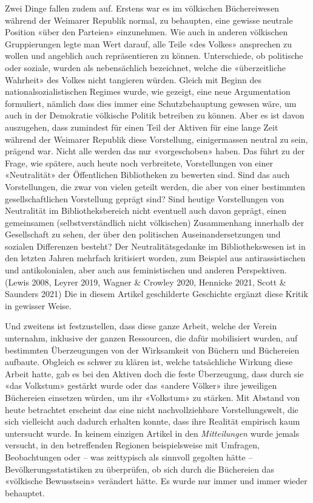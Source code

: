 \documentclass[a4paper,
fontsize=11pt,
oneside,
numbers=noperiodatend,
parskip=half-,
bibliography=totoc,
final
]{scrartcl}
\begin{document}
Zwei Dinge fallen zudem auf. Erstens war es im völkischen Büchereiwesen
während der Weimarer Republik normal, zu behaupten, eine gewisse
neutrale Position «über den Parteien» einzunehmen. Wie auch in anderen
völkischen Gruppierungen legte man Wert darauf, alle Teile «des Volkes»
ansprechen zu wollen und angeblich auch repräsentieren zu können.
Unterschiede, ob politische oder soziale, wurden als nebensächlich
bezeichnet, welche die «überzeitliche Wahrheit» des Volkes nicht
tangieren würden. Gleich mit Beginn des nationalsozialistischen Regimes
wurde, wie gezeigt, eine neue Argumentation formuliert, nämlich dass
dies immer eine Schutzbehauptung gewesen wäre, um auch in der Demokratie
völkische Politik betreiben zu können. Aber es ist davon auszugehen,
dass zumindest für einen Teil der Aktiven für eine lange Zeit während
der Weimarer Republik diese Vorstellung, einigermassen neutral zu sein,
prägend war. Nicht alle werden das nur «vorgeschoben» haben. Das führt
zu der Frage, wie spätere, auch heute noch verbreitete, Vorstellungen
von einer «Neutralität» der Öffentlichen Bibliotheken zu bewerten sind.
Sind das auch Vorstellungen, die zwar von vielen geteilt werden, die
aber von einer bestimmten gesellschaftlichen Vorstellung geprägt sind?
Sind heutige Vorstellungen von Neutralität im Bibliotheksbereich nicht
eventuell auch davon geprägt, einen gemeinsamen (selbstverständlich
nicht völkischen) Zusammenhang innerhalb der Gesellschaft zu sehen, der
über den politischen Auseinandersetzungen und sozialen Differenzen
besteht? Der Neutralitätsgedanke im Bibliothekswesen ist in den letzten
Jahren mehrfach kritisiert worden, zum Beispiel aus antirassistischen
und antikolonialen, aber auch aus feministischen und anderen
Perspektiven. (Lewis 2008, Leyrer 2019, Wagner \& Crowley 2020, Hennicke
2021, Scott \& Saunders 2021) Die in diesem Artikel geschilderte
Geschichte ergänzt diese Kritik in gewisser Weise.

Und zweitens ist festzustellen, dass diese ganze Arbeit, welche der
Verein unternahm, inklusive der ganzen Ressourcen, die dafür mobilisiert
wurden, auf bestimmten Überzeugungen von der Wirksamkeit von Büchern und
Büchereien aufbaute. Obgleich es schwer zu klären ist, welche
tatsächliche Wirkung diese Arbeit hatte, gab es bei den Aktiven doch die
feste Überzeugung, dass durch sie «das Volkstum» gestärkt wurde oder das
«andere Völker» ihre jeweiligen Büchereien einsetzen würden, um ihr
«Volkstum» zu stärken. Mit Abstand von heute betrachtet erscheint das
eine nicht nachvollziehbare Vorstellungswelt, die sich vielleicht auch
dadurch erhalten konnte, dass ihre Realität empirisch kaum untersucht
wurde. In keinem einzigen Artikel in den \emph{Mitteilungen} wurde
jemals versucht, in den betreffenden Regionen beispielsweise mit
Umfragen, Beobachtungen oder -- was zeittypisch als sinnvoll gegolten
hätte -- Bevölkerungsstatistiken zu überprüfen, ob sich durch die
Büchereien das «völkische Bewusstsein» verändert hätte. Es wurde nur
immer und immer wieder behauptet.
\end{document}
